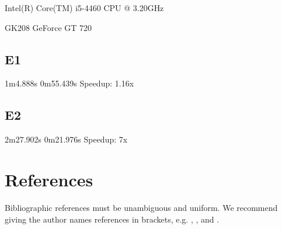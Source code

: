 \documentclass[12pt]{article}
\begin{document}
Intel(R) Core(TM) i5-4460  CPU @ 3.20GHz

GK208 GeForce GT 720

\subsection{E1}

1m4.888s
0m55.439s
Speedup: 1.16x


\subsection{E2}

2m27.902s
0m21.976s
Speedup: 7x


\section{References}

Bibliographic references must be unambiguous and uniform.  We recommend giving
the author names references in brackets, e.g. \cite{knuth:84},
\cite{boulic:91}, and \cite{smith:99}.




\end{document}
